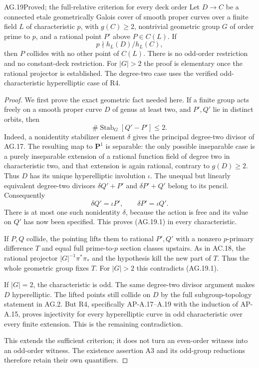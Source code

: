 \begin{claim}{AG.19}{Proved; the full-relative criterion for every deck order}
Let $D\to C$ be a connected etale geometrically Galois
cover of smooth proper curves over a finite field $L$
of characteristic $p$, with $g(C)\ge2$, nontrivial
geometric group $G$ of order prime to $p$, and a rational
point $P'$ above $P\in C(L)$. If
\[
                       p\nmid h_L(D)/h_L(C),
\]
then $P$ collides with no other point of $C(L)$.
There is no odd-order restriction and no constant-deck
restriction. For $|G|>2$ the proof is elementary once
the rational projector is established. The degree-two
case uses the verified odd-characteristic hyperelliptic
case of R4.
\end{claim}
\begin{proof}
We first prove the exact geometric fact needed here.
If a finite group acts freely on a smooth proper curve
$D$ of genus at least two, and $P',Q'$ lie in distinct
orbits, then
\[
             \#\operatorname{Stab}_G[Q'-P']\le2.       \tag{AG.19.1}
\]
Indeed, a nonidentity stabilizer element $\delta$ gives
the principal degree-two divisor of AG.17. The resulting
map to $\mathbf P^1$ is separable: the only possible
inseparable case is a purely inseparable extension of a
rational function field of degree two in characteristic
two, and that extension is again rational, contrary to
$g(D)\ge2$. Thus $D$ has its unique hyperelliptic
involution $\iota$. The unequal but linearly equivalent
degree-two divisors
$\delta Q'+P'$ and $\delta P'+Q'$ belong to its pencil.
Consequently
\[
                   \delta Q'=\iota P',\qquad
                   \delta P'=\iota Q'.
\]
There is at most one such nonidentity $\delta$, because
the action is free and its value on $Q'$ has now been
specified. This proves (AG.19.1) in every characteristic.

If $P,Q$ collide, the pointing lifts them to rational
$P',Q'$ with a nonzero $p$-primary difference $T$ and
equal full prime-to-$p$ section classes upstairs. As in
AC.18, the rational projector
$|G|^{-1}\pi^*\pi_*$ and the hypothesis kill the new
part of $T$. Thus the whole geometric group fixes $T$.
For $|G|>2$ this contradicts (AG.19.1).

If $|G|=2$, the characteristic is odd. The same
degree-two divisor argument makes $D$ hyperelliptic.
The lifted points still collide on $D$ by the full
subgroup-topology statement in AG.2. But R4, specifically
AP-A.17--A.19 with the induction of AP-A.15, proves
injectivity for every hyperelliptic curve in odd
characteristic over every finite extension. This is the
remaining contradiction.

This extends the sufficient criterion; it does not turn
an even-order witness into an odd-order witness. The
existence assertion A3 and its odd-group reductions
therefore retain their own quantifiers.
\end{proof}

